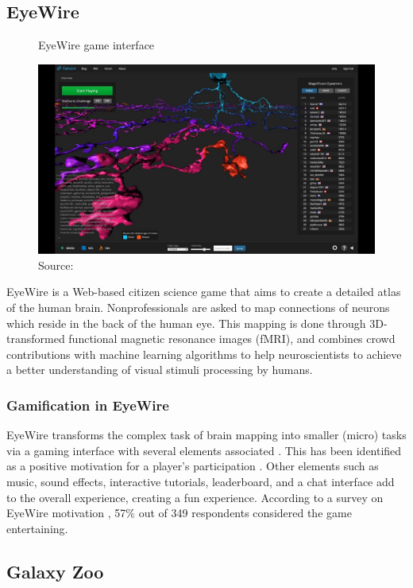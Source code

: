\subsection{EyeWire}

\begin{figure}[ht]
    \centering
    \caption{EyeWire game interface}
    \includegraphics[width=0.8\linewidth]{images/background/eyewire.jpg}
    \caption*{Source: \cite{eyewire2014how}}
    \label{fig:eyewire-game-interface}
\end{figure}

EyeWire is a Web-based citizen science game that aims to create a detailed atlas of the human brain. Nonprofessionals are asked to map connections of neurons which reside in the back of the human eye. This mapping is done through 3D-transformed functional magnetic resonance images (fMRI), and combines crowd contributions with machine learning algorithms to help neuroscientists to achieve a better understanding of visual stimuli processing by humans.

\subsubsection{Gamification in EyeWire}

EyeWire transforms the complex task of brain mapping into smaller (micro) tasks via a gaming interface with several elements associated \cite{seaborn2015gamification}. This has been identified as a positive motivation for a player's participation \cite{tinati2016because}. Other elements such as music, sound effects, interactive tutorials, leaderboard, and a chat interface add to the overall experience, creating a fun experience. According to a survey on EyeWire motivation \cite{tinati2016because}, 57\% out of 349 respondents considered the game entertaining.

\subsection{Galaxy Zoo}

